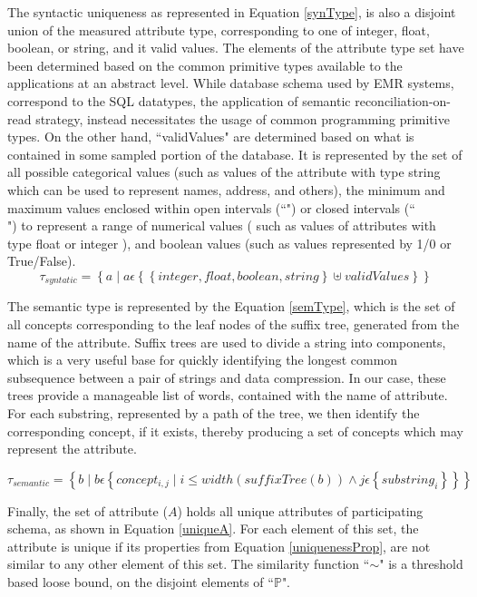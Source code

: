 The syntactic uniqueness as represented in Equation \eqref{synType}, is also a disjoint union of the measured attribute type, corresponding to one of integer, float, boolean, or string, and it valid values. The elements of the attribute type set have been determined based on the common primitive types available to the applications at an abstract level. While database schema used by EMR systems, correspond to the SQL datatypes\cite{SQLDataTypes}, the application of semantic reconciliation-on-read strategy, instead necessitates the usage of common programming primitive types. On the other hand, ``validValues" are determined based on what is contained in some sampled portion of the database. It is represented by the set of all possible categorical values (such as values of the attribute with type string which can be used to represent names, address, and others), the minimum and maximum values enclosed within open intervals (``\( \)") or closed intervals (``\[ \]") to represent a range of numerical values ( such as values of attributes with type float or integer ), and boolean values (such as values represented by 1/0 or True/False).
\begin{equation}\label{synType}
\tau_{syntatic}= \left \{ a \mid a \epsilon \left \{ \left \{ integer, float, boolean, string\right \} \uplus validValues \right \} \right \}
\end{equation}

The semantic type is represented by the Equation \eqref{semType}, which is the set of all concepts corresponding to the leaf nodes of the suffix tree, generated from the name of the attribute. Suffix trees are used to divide a string into components, which is a very useful base for quickly identifying the longest common subsequence between a pair of strings and data compression. In our case, these trees provide a manageable list of words, contained with the name of attribute. For each substring, represented by a path of the tree, we then identify the corresponding concept, if it exists, thereby producing a set of concepts which may represent the attribute.

\begin{equation}\label{semType}
\tau_{semantic}= \left \{b \mid b \epsilon \left \{ concept_{i,j} \mid i \leq width(suffixTree(b)) \wedge j \epsilon \left \{ substring_i \right \} \right \} \right \}
\end{equation}

Finally, the set of attribute ($A$) holds all unique attributes of participating schema, as shown in Equation \eqref{uniqueA}. For each element of this set, the attribute is unique if its properties from Equation \eqref{uniquenessProp}, are not similar to any other element of this set. The similarity function ``$\sim$" is a threshold based loose bound, on the disjoint elements of ``$\mathbb{P}$".


